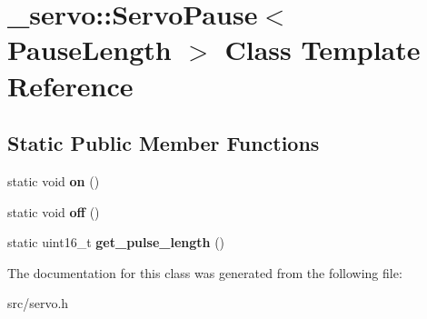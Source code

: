 \hypertarget{class__servo_1_1ServoPause}{}\section{\+\_\+servo\+:\+:Servo\+Pause$<$ Pause\+Length $>$ Class Template Reference}
\label{class__servo_1_1ServoPause}
\subsection*{Static Public Member Functions}
\begin{DoxyCompactItemize}
\item 
\hypertarget{class__servo_1_1ServoPause_a5ba24fe2aaf22387237dc508396a1446}{}\label{class__servo_1_1ServoPause_a5ba24fe2aaf22387237dc508396a1446} 
static void {\bfseries on} ()
\item 
\hypertarget{class__servo_1_1ServoPause_ae4ac75932cc1d1a66edd7df5f99459cb}{}\label{class__servo_1_1ServoPause_ae4ac75932cc1d1a66edd7df5f99459cb} 
static void {\bfseries off} ()
\item 
\hypertarget{class__servo_1_1ServoPause_a6ef77748294ed41b40e04dad1f5fd019}{}\label{class__servo_1_1ServoPause_a6ef77748294ed41b40e04dad1f5fd019} 
static uint16\+\_\+t {\bfseries get\+\_\+pulse\+\_\+length} ()
\end{DoxyCompactItemize}


The documentation for this class was generated from the following file\+:\begin{DoxyCompactItemize}
\item 
src/servo.\+h\end{DoxyCompactItemize}
